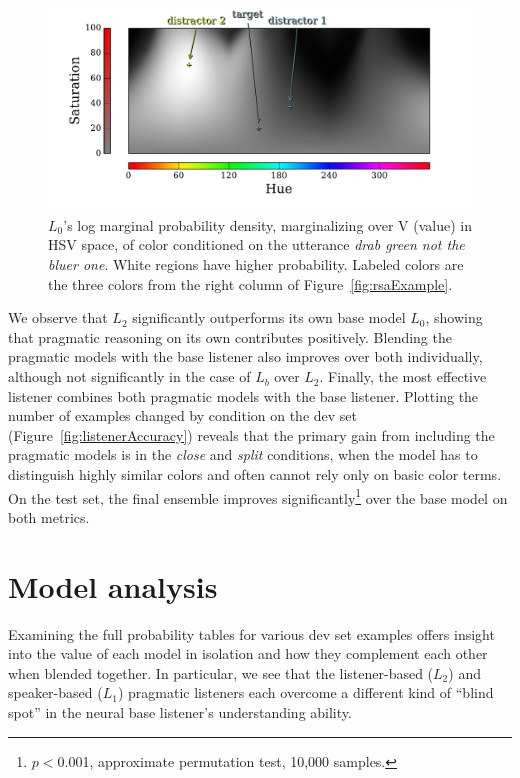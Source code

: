 \documentclass[11pt,letterpaper]{article}
\newcommand{\word}{\textit}
\newcommand{\Listener}{L}
\renewcommand{\|}{\mid}
\newcommand{\figref}[1]{Figure~\ref{#1}}
\newcommand{\cond}{\emph}
\begin{document}
\begin{figure}[t]
\centering
\includegraphics[trim={1cm 0.8cm 2.1cm 0},clip,width = \columnwidth]{figures/gaussian}
\caption{$\Listener_0$'s log marginal probability density, marginalizing over
V (value) in HSV space, of color conditioned on the utterance
\word{drab green not the bluer one}. White regions have higher probability.
Labeled colors are the three colors from the right column of
\figref{fig:rsaExample}. }
\label{fig:gaussian}
\end{figure}

We observe that
$\Listener_2$ significantly outperforms its own base model $\Listener_0$,
showing that pragmatic reasoning on its own contributes positively. Blending the
pragmatic models with the base listener also improves over both individually,
although not significantly in the case of $\Listener_b$ over $\Listener_2$.
Finally, the
most effective listener combines both pragmatic models with the base listener.
Plotting the number of examples changed by condition on the dev set
(\figref{fig:listenerAccuracy}) reveals that
the primary gain from including the pragmatic models is in the
\cond{close} and \cond{split} conditions, when the
model has to distinguish highly similar colors and
often cannot rely only on basic color terms.
On the test set, the final ensemble improves
significantly\footnote{$p <{}$0.001, approximate
permutation test, 10,000 samples.} over the base model on both metrics.

\section{Model analysis}

Examining the full probability tables for various dev set examples offers insight
into the value of each model in isolation and how they complement each other when
blended together. In particular, we see that the listener-based ($\Listener_2$)
and speaker-based ($\Listener_1$) pragmatic listeners each overcome a different
kind of ``blind spot'' in the neural base listener's understanding ability.
\end{document}
